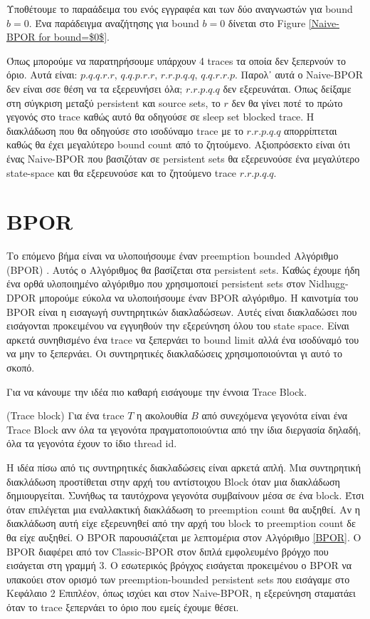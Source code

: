 Υποθέτουμε το παραάδειμα του ενός εγγραφέα και των δύο αναγνωστών για bound $b=0$. Ένα παράδειγμα αναζήτησης για bound $b=0$ δίνεται στο Figure \ref{Naive-BPOR for bound=$0$}. 

\label{Vanilla0}    

Όπως μπορούμε να παρατηρήσουμε υπάρχουν 4 traces τα οποία δεν ξεπερνούν το όριο. Αυτά είναι:
$p.q.q.r.r$, $q.q.p.r.r$, $r.r.p.q.q$, $q.q.r.r.p$.
Παρολ᾽ αυτά ο Naive-BPOR δεν είναι σσε θέση να τα εξερευνήσει όλα; $r.r.p.q.q$ δεν εξερευνάται.
Όπως δείξαμε στη σύγκριση μεταξύ  persistent και source sets, το $r$ δεν θα γίνει ποτέ το πρώτο γεγονός στο trace
καθώς αυτό θα οδηγούσε σε sleep set blocked trace. Η διακλάδωση που θα οδηγούσε στο ισοδύναμο trace με το $r.r.p.q.q$ απορρίπτεται
καθώς θα έχει μεγαλύτερο bound count από το ζητούμενο. Αξιοπρόσεκτο είναι ότι ένας Naive-BPOR που βασιζόταν σε persistent sets θα εξερευνούσε ένα μεγαλύτερο state-space
και θα εξερευνούσε και το ζητούμενο trace $r.r.p.q.q$.

\section{BPOR}

Το επόμενο βήμα είναι να υλοποιήσουμε έναν preemption bounded Αλγόριθμο (BPOR) \cite{BPOR}. Αυτός ο Αλγόριθμος θα βασίζεται στα
persistent sets. Καθώς έχουμε ήδη ένα ορθά υλοποιημένο αλγόριθμο που χρησιμοποιεί persistent sets στον Nidhugg-DPOR μπορούμε εύκολα να υλοποιήσουμε έναν BPOR
αλγόριθμο. Η καινοτμία του BPOR είναι η εισαγωγή συντηρητικών διακλαδώσεων. Αυτές είναι διακλαδώσει που εισάγονται προκειμένου να εγγυηθούν την εξερεύνηση όλου του
state space.
Είναι αρκετά συνηθισμένο ένα trace να ξεπερνάει το  bound limit
αλλά ένα ισοδύναμό του να μην το ξεπερνάει. Οι συντηρητικές διακλαδώσεις χρησιμοποιούνται γι αυτό το σκοπό.

Για να κάνουμε την ιδέα πιο καθαρή εισάγουμε την έννοια Trace Block.
\begin{definition}{(Trace block)}
Για ένα trace $T$ η ακολουθία $B$ από συνεχόμενα γεγονότα είναι ένα Trace Block ανν όλα τα γεγονότα πραγματοποιούντια από την ίδια διεργασία δηλαδή,
όλα τα γεγονότα έχουν το ίδιο thread id.
\end{definition}

Η ιδέα πίσω από τις συντηρητικές διακλαδώσεις είναι αρκετά απλή. Μια συντηρητική διακλάδωση προστίθεται στην αρχή του αντίστοιχου
Block όταν μια διακλάδωση δημιουργείται.
Συνήθως τα ταυτόχρονα γεγονότα συμβαίνουν μέσα σε ένα block. Έτσι όταν επιλέγεται μια εναλλακτική διακλάδωση 
το preemption count θα αυξηθεί. Αν η διακλάδωση αυτή είχε εξερευνηθεί από την αρχή του block το preemption count δε θα είχε αυξηθεί.
Ο BPOR παρουσιάζεται με λεπτομέρια στον Αλγόριθμο \ref{BPOR}. Ο BPOR διαφέρει από τον Classic-BPOR στον διπλά εμφολευμένο βρόγχο που εισάγεται
στη γραμμή 3. Ο εσωτερικός βρόγχος εισάγεται προκειμένου ο BPOR να υπακούει στον ορισμό των preemption-bounded persistent sets που εισάγαμε στο Κεφάλαιο 2
Επιπλέον, όπως ισχύει και στον Naive-BPOR, η εξερεύνηση σταματάει όταν το trace ξεπερνάει το όριο που εμείς έχουμε θέσει.

